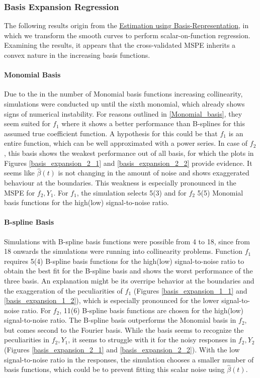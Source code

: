 \documentclass[11pt,twoside,a4paper]{article}
\begin{document}
	\subsubsection{Basis Expansion Regression}
	The following results origin from the \hyperref[basis_exp_transf]{Estimation using Basis-Representation}, in which we transform the smooth curves to perform scalar-on-function regression. Examining the results, it appears that the cross-validated MSPE inherits a convex nature in the increasing basis functions.
	
	\paragraph{Monomial Basis}
	Due to the in the number of Monomial basis functions increasing collinearity, simulations were conducted up until the sixth monomial, which already shows signs of numerical instability. For reasons outlined in \ref{Monomial_basis}, they seem suited for $f_1$ where it shows a better performance than B-splines for this assumed true coefficient function. A hypothesis for this could be that $f_1$ is an entire function, which can be well approximated with a power series. In case of $f_2$, this basis shows the weakest performance out of all basis, for which the plots in Figures \ref{basis_expansion_2_1} and \ref{basis_expansion_2_2} provide evidence. It seems like $\hat{\beta}(t)$ is not changing in the amount of noise and shows exaggerated behaviour at the boundaries. This weakness is especially pronounced in the MSPE for $f_2,Y_1$. For $f_1$, the simulation selects 5(3) and for $f_2$ 5(5) Monomial basis functions for the high(low) signal-to-noise ratio. 
	\vspace{-0.2cm}
	
	\paragraph{B-spline Basis}
	Simulations with B-spline basis functions were possible from 4 to 18, since from 18 onwards the simulations were running into collinearity problems.
	Function $f_1$ requires 5(4) B-spline basis functions for the high(low) signal-to-noise ratio to obtain the best fit for the B-spline basis and shows the worst performance of the three basis. An explanation might be its overripe behavior at the boundaries and the exaggeration of the peculiarities of $f_1$ (Figures \ref{basis_expansion_1_1} and \ref{basis_expansion_1_2}), which is especially pronounced for the lower signal-to-noise ratio. For $f_2$, 11(6) B-spline basis functions are chosen for the high(low) signal-to-noise ratio. The B-spline basis outperforms the Monomial basis in $f_2$, but comes second to the Fourier basis. While the basis seems to recognize the peculiarities in $f_2,Y_1$, it seems to struggle with it for the noisy responses in $f_2,Y_2$ (Figures \ref{basis_expansion_2_1} and \ref{basis_expansion_2_2}). With the low signal-to-noise ratio in the responses, the simulation chooses a smaller number of basis functions, which could be to prevent fitting this scalar noise using $\hat{\beta}(t)$.
	\vspace{-0.2cm}
	
\end{document}
